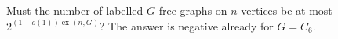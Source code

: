 Must the number of labelled $G$-free graphs on $n$ vertices be at most $2^{(1+o(1))\operatorname{ex}(n,G)}$? The answer is negative already for $G=C_6$.
